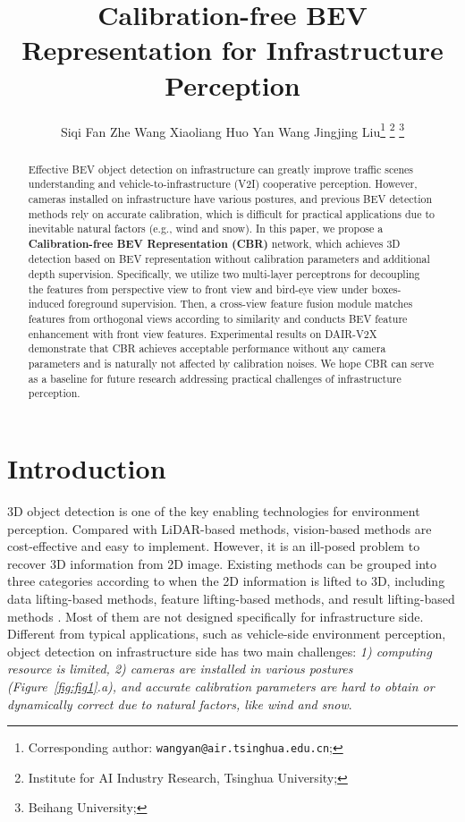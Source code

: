\documentclass[letterpaper, 10 pt, conference]{ieeeconf}
\title{\LARGE \bf
Calibration-free BEV Representation for Infrastructure Perception
}
\author{Siqi Fan  Zhe Wang  Xiaoliang Huo  Yan Wang Jingjing Liu\thanks{ Corresponding author: {\tt\small wangyan@air.tsinghua.edu.cn};}
\thanks{ Institute for AI Industry Research, Tsinghua University;}
\thanks{ Beihang University;}
}
\begin{document}
\maketitle
\thispagestyle{empty}
\pagestyle{empty}


\begin{abstract}

Effective BEV object detection on infrastructure can greatly improve traffic scenes understanding and vehicle-to-infrastructure (V2I) cooperative perception. However, cameras installed on infrastructure have various postures, and previous BEV detection methods rely on accurate calibration, which is difficult for practical applications due to inevitable natural factors (e.g., wind and snow). In this paper, we propose a \textbf{Calibration-free BEV Representation (CBR)} network, which achieves 3D detection based on BEV representation without calibration parameters and additional depth supervision. Specifically, we utilize two multi-layer perceptrons for decoupling the features from perspective view to front view and bird-eye view under boxes-induced foreground supervision. Then, a cross-view feature fusion module matches features from orthogonal views according to similarity and conducts BEV feature enhancement with front view features. Experimental results on DAIR-V2X demonstrate that CBR achieves acceptable performance without any camera parameters and is naturally not affected by calibration noises. We hope CBR can serve as a baseline for future research addressing practical challenges of infrastructure perception.

\end{abstract}


\section{Introduction}
\label{sec:intro}

3D object detection is one of the key enabling technologies for environment perception. Compared with LiDAR-based methods, vision-based methods are cost-effective and easy to implement. However, it is an ill-posed problem to recover 3D information from 2D image.  Existing methods can be grouped into three categories according to when the 2D information is lifted to 3D, including data lifting-based methods, feature lifting-based methods, and result lifting-based methods \cite{ma20223d}. Most of them are not designed specifically for infrastructure side. Different from typical applications, such as vehicle-side environment perception, object detection on infrastructure side has two main challenges: \textit{1) computing resource is limited, 2) cameras are installed in various postures (Figure~\ref{fig:fig1}.a), and accurate calibration parameters are hard to obtain or dynamically correct due to natural factors, like wind and snow}.
\end{document}
